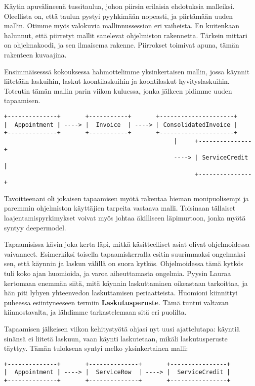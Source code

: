 Käytin apuvälineenä tussitaulua, johon piirsin erilaisia ehdotuksia
malleiksi. Oleellista on, että taulun pystyi pyyhkimään nopeasti, ja
piirtämään uuden mallin. Otimme myös valokuvia mallinnussession eri
vaiheista. En kuitenkaan halunnut, että piirretyt mallit sanelevat
ohjelmiston rakennetta. Tärkein mittari on ohjelmakoodi, ja sen
ilmaisema rakenne. Piirrokset toimivat apuna, tämän rakenteen kuvaajina.

Ensimmäisesssä kokouksessa hahmottelimme yksinkertaisen mallin, jossa
käynnit liitetään laskuihin, laskut koontilaskuihin ja koontilaskut
hyvityslaskuihin. Toteutin tämän mallin parin viikon kuluessa, jonka
jälkeen pidimme uuden tapaamisen.

\begin{verbatim}
+--------------+       +-----------+       +---------------------+
|  Appointment | ----> |  Invoice  | ----> | ConsolidatedInvoice |
+--------------+       +-----------+       +---------------------+
                                                |     +---------------+ 
                                                ----> | ServiceCredit | 
                                                      +---------------+ 
\end{verbatim}

Tavoitteenani oli jokaisen tapaamisen myötä rakentaa hieman
monipuolisempi ja paremmin ohjelmiston käyttäjien tarpeita vastaava
malli. Toisinaan tällaiset laajentamispyrkimykset voivat myös johtaa
äkilliseen läpimurtoon, jonka myötä syntyy
\gls{deepermodel}.\cite{evans:ddd}

Tapaamisissa kävin joka kerta läpi, mitkä käsitteelliset asiat olivat
ohjelmoidessa vaivanneet. Esimerkiksi toisella tapaamiskerralla esitin
suurimmaksi ongelmaksi sen, että käynnin ja laskun välillä on suora
kytkös. Ohjelmoidessa tämä kytkös tuli koko ajan huomioida, ja varoa
aiheuttamasta ongelmia. Pyysin Lauraa kertomaan enemmän siitä, mitä
käynnin laskuttaminen oikeastaan tarkoittaa, ja hän piti lyhyen
yhteenvedon laskuttamisen periaatteista. Huomioni kiinnittyi puheessa
esiintyneeseen termiin \textbf{Laskutusperuste}. Tämä tuntui valtavan
kiinnostavalta, ja lähdimme tarkastelemaan sitä eri puolilta.

Tapaamisen jälkeisen viikon kehitystyötä ohjasi nyt uusi ajattelutapa:
käyntiä sinänsä ei liitetä laskuun, vaan käynti laskutetaan, mikäli
laskutusperuste täyttyy. Tämän tuloksena syntyi melko yksinkertainen
malli:

\begin{verbatim}
+--------------+       +--------------+       +----------------+
|  Appointment | ----> |  ServiceRow  | ----> |  ServiceCredit |
+--------------+       +--------------+       +----------------+
\end{verbatim}

